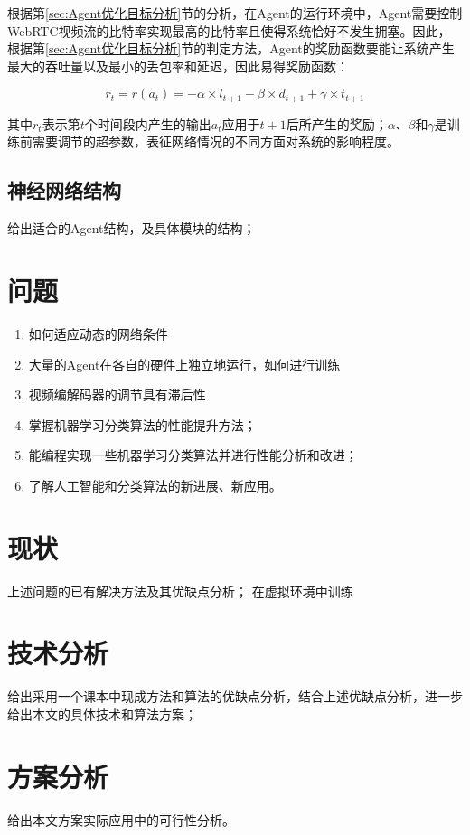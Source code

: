 \documentclass[a4paper]{ctexart}
\begin{document}
根据第\ref{sec:Agent优化目标分析}节的分析，在Agent的运行环境中，Agent需要控制WebRTC视频流的比特率实现最高的比特率且使得系统恰好不发生拥塞。因此，根据第\ref{sec:Agent优化目标分析}节的判定方法，Agent的奖励函数要能让系统产生最大的吞吐量以及最小的丢包率和延迟，因此易得奖励函数：

$$r_t=r(a_t)=-\alpha\times l_{t+1}-\beta\times d_{t+1}+\gamma\times t_{t+1}$$

其中$r_t$表示第$t$个时间段内产生的输出$a_t$应用于$t+1$后所产生的奖励；$\alpha$、$\beta$和$\gamma$是训练前需要调节的超参数，表征网络情况的不同方面对系统的影响程度。

\subsection{神经网络结构}

给出适合的Agent结构，及具体模块的结构；
\section{问题}
\begin{enumerate}[label=\arabic*、]
	\item 如何适应动态的网络条件
	\item 大量的Agent在各自的硬件上独立地运行，如何进行训练
	\item 视频编解码器的调节具有滞后性
	\item 掌握机器学习分类算法的性能提升方法；
	\item 能编程实现一些机器学习分类算法并进行性能分析和改进；
	\item 了解人工智能和分类算法的新进展、新应用。
\end{enumerate}
\section{现状}
上述问题的已有解决方法及其优缺点分析；
在虚拟环境中训练
\section{技术分析}
给出采用一个课本中现成方法和算法的优缺点分析，结合上述优缺点分析，进一步给出本文的具体技术和算法方案；
\section{方案分析}
给出本文方案实际应用中的可行性分析。

\end{document}
